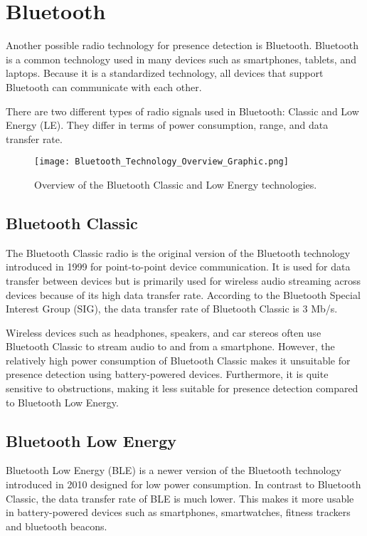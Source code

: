 \section{Bluetooth} \label{sec:bluetooth}
Another possible radio technology for presence detection is Bluetooth.
Bluetooth is a common technology used in many devices such as smartphones, tablets, and laptops.
Because it is a standardized technology, all devices that support Bluetooth can communicate with each other\cite{BluetoothOverview}.\cite{BluetoothSIG}

There are two different types of radio signals used in Bluetooth: Classic and Low Energy (LE).
They differ in terms of power consumption, range, and data transfer rate.\cite{BluetoothOverview}

\begin{figure}[h!]
  \centering
  \texttt{[image: Bluetooth\_Technology\_Overview\_Graphic.png]}
  \caption{Overview of the Bluetooth Classic and Low Energy technologies\cite{BluetoothOverview}.}
  \label{fig:classic_vs_LE}
\end{figure}

\subsection{Bluetooth Classic} \label{sec:bluetooth_classic}
The Bluetooth Classic radio is the original version of the Bluetooth technology introduced in 1999 for point-to-point device communication.
It is used for data transfer between devices but is primarily used for wireless audio streaming across devices because of its high data transfer rate.
According to the Bluetooth Special Interest Group (SIG), the data transfer rate of Bluetooth Classic is 3 Mb/s.\cite{BluetoothSIG}\cite{BluetoothOverview}

Wireless devices such as headphones, speakers, and car stereos often use Bluetooth Classic to stream audio to and from a smartphone.
However, the relatively high power consumption of Bluetooth Classic makes it unsuitable for presence detection using battery-powered devices.
Furthermore, it is quite sensitive to obstructions, making it less suitable for presence detection compared to Bluetooth Low Energy.\cite{BluetoothOverview}\cite{BluetoothAudioStreaming}

\subsection{Bluetooth Low Energy} \label{sec:bluetooth_low_energy}
Bluetooth Low Energy (BLE) is a newer version of the Bluetooth technology introduced in 2010 designed for low power consumption.
In contrast to Bluetooth Classic, the data transfer rate of BLE is much lower.
This makes it more usable in battery-powered devices such as smartphones, smartwatches, fitness trackers and bluetooth beacons.\cite{BLE_Regulatory_Aspects_Document}

